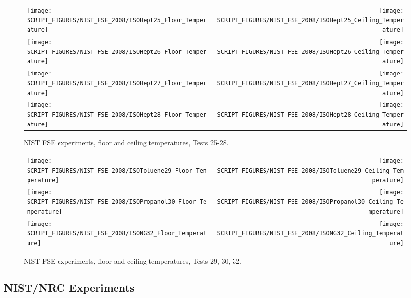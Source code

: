 \begin{figure}[p]
\begin{tabular*}{\textwidth}{l@{\extracolsep{\fill}}r}
\texttt{[image: SCRIPT\_FIGURES/NIST\_FSE\_2008/ISOHept25\_Floor\_Temperature]} &
\texttt{[image: SCRIPT\_FIGURES/NIST\_FSE\_2008/ISOHept25\_Ceiling\_Temperature]} \\
\texttt{[image: SCRIPT\_FIGURES/NIST\_FSE\_2008/ISOHept26\_Floor\_Temperature]} &
\texttt{[image: SCRIPT\_FIGURES/NIST\_FSE\_2008/ISOHept26\_Ceiling\_Temperature]} \\
\texttt{[image: SCRIPT\_FIGURES/NIST\_FSE\_2008/ISOHept27\_Floor\_Temperature]} &
\texttt{[image: SCRIPT\_FIGURES/NIST\_FSE\_2008/ISOHept27\_Ceiling\_Temperature]} \\
\texttt{[image: SCRIPT\_FIGURES/NIST\_FSE\_2008/ISOHept28\_Floor\_Temperature]} &
\texttt{[image: SCRIPT\_FIGURES/NIST\_FSE\_2008/ISOHept28\_Ceiling\_Temperature]}
\end{tabular*}
\caption{NIST FSE experiments, floor and ceiling temperatures, Tests 25-28.}
\label{NIST_FSE_2008_Surface_Temp_6}
\end{figure}

\begin{figure}[p]
\begin{tabular*}{\textwidth}{l@{\extracolsep{\fill}}r}
\texttt{[image: SCRIPT\_FIGURES/NIST\_FSE\_2008/ISOToluene29\_Floor\_Temperature]} &
\texttt{[image: SCRIPT\_FIGURES/NIST\_FSE\_2008/ISOToluene29\_Ceiling\_Temperature]} \\
\texttt{[image: SCRIPT\_FIGURES/NIST\_FSE\_2008/ISOPropanol30\_Floor\_Temperature]} &
\texttt{[image: SCRIPT\_FIGURES/NIST\_FSE\_2008/ISOPropanol30\_Ceiling\_Temperature]} \\
\texttt{[image: SCRIPT\_FIGURES/NIST\_FSE\_2008/ISONG32\_Floor\_Temperature]} &
\texttt{[image: SCRIPT\_FIGURES/NIST\_FSE\_2008/ISONG32\_Ceiling\_Temperature]}
\end{tabular*}
\caption{NIST FSE experiments, floor and ceiling temperatures, Tests 29, 30, 32.}
\label{NIST_FSE_2008_Surface_Temp_7}
\end{figure}

\clearpage

\subsection{NIST/NRC Experiments}

